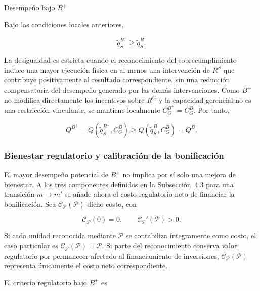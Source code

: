 \begin{resultadobox}
{Desempeño bajo \(B^{+}\)}
\label{res:desempeno_bplus}

Bajo las condiciones locales anteriores,

\begin{equation}
\widetilde q_S^{B^{+}}
\geq
\widetilde q_S^{B}.
\end{equation}

La desigualdad es estricta cuando el reconocimiento del sobrecumplimiento induce una mayor ejecución física en al menos una intervención de \(R^{S}\) que contribuye positivamente al resultado correspondiente, sin una reducción compensatoria del desempeño generado por las demás intervenciones. Como \(B^{+}\) no modifica directamente los incentivos sobre \(R^{G}\) y la capacidad gerencial no es una restricción vinculante, se mantiene localmente \(C_G^{B^{+}}=C_G^{B}\). Por tanto,

\begin{equation}
Q^{B^{+}}
=
Q\!\left(\widetilde q_S^{B^{+}},C_G^{B}\right)
\geq
Q\!\left(\widetilde q_S^{B},C_G^{B}\right)
=
Q^{B}.
\end{equation}
\end{resultadobox}

\subsubsection{Bienestar regulatorio y calibración de la bonificación}

El mayor desempeño potencial de \(B^{+}\) no implica por sí solo una mejora de bienestar. A los tres componentes definidos en la Subsección~4.3 para una transición \(m\to m'\) se añade ahora el costo regulatorio neto de financiar la bonificación. Sea \(\mathcal C_{\mathcal P}(\mathcal P)\) dicho costo, con

\begin{equation}
\label{eq:costo_bonificacion_bplus}
\mathcal C_{\mathcal P}(0)=0,
\qquad
\mathcal C_{\mathcal P}'(\mathcal P)>0.
\end{equation}

Si cada unidad reconocida mediante \(\mathcal P\) se contabiliza íntegramente como costo, el caso particular es \(\mathcal C_{\mathcal P}(\mathcal P)=\mathcal P\). Si parte del reconocimiento conserva valor regulatorio por permanecer afectado al financiamiento de inversiones, \(\mathcal C_{\mathcal P}(\mathcal P)\) representa únicamente el costo neto correspondiente.

El criterio regulatorio bajo \(B^{+}\) es


